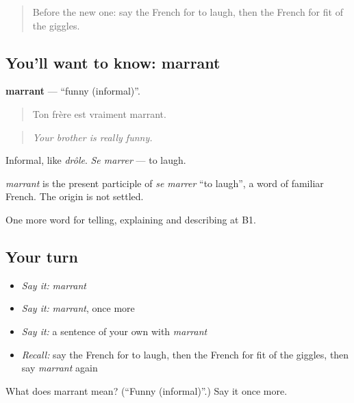 \begin{quote}
Before the new one: say the French for to laugh, then the French for fit of the giggles.
\end{quote}

\subsection*{You'll want to know: marrant}
\textbf{marrant} — \textquotedblleft{}funny (informal)\textquotedblright{}.

\begin{quote}
Ton frère est vraiment marrant.
\end{quote}

\begin{quote}
\emph{Your brother is really funny.}
\end{quote}

Informal, like \emph{drôle}. \emph{Se marrer} — to laugh.

\begin{cousinweb}
\emph{marrant} is the present participle of \emph{se marrer} \textquotedblleft{}to laugh\textquotedblright{}, a word of familiar French. The origin is not settled.
\end{cousinweb}

\begin{grammarlens}[title={What you've built}]
One more word for telling, explaining and describing at B1.
\end{grammarlens}

\subsection*{Your turn}
\begin{itemize}
\raggedright
  \item \emph{Say it:} \emph{marrant}
  \item \emph{Say it:} \emph{marrant}, once more
  \item \emph{Say it:} a sentence of your own with \emph{marrant}
  \item \emph{Recall:} say the French for to laugh, then the French for fit of the giggles, then say \emph{marrant} again
\end{itemize}

\begin{tcolorbox}[breakable,colback=teal!4,colframe=teal!35!black,title={Before you move on}]
What does marrant mean? (\textquotedblleft{}Funny (informal)\textquotedblright{}.) Say it once more.
\end{tcolorbox}
